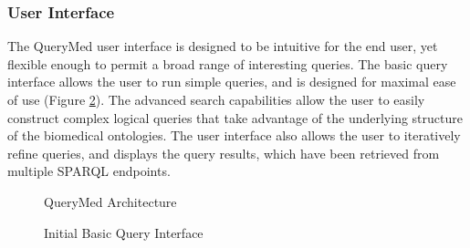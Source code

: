 \documentclass{www2010-submission}
\begin{document}


\subsubsection{User Interface}

The QueryMed user interface is designed to be intuitive for the end user, yet flexible enough to permit a broad range of interesting queries.  The basic query interface allows the user to run simple queries, and is designed for maximal ease of use (Figure \ref{fig:initial_ui}).  The advanced search capabilities allow the user to easily construct complex logical queries that take advantage of the underlying structure of the biomedical ontologies.  The user interface also allows the user to iteratively refine queries, and displays the query results, which have been retrieved from multiple SPARQL endpoints.

\begin{figure}
\centering
{}
\caption{QueryMed Architecture}
\label{fig:arch_details}
\end{figure}

\smallskip


\begin{figure}
\centering
{}
\caption{Initial Basic Query Interface}
\label{fig:initial_ui}
\end{figure}

\smallskip
\end{document}
